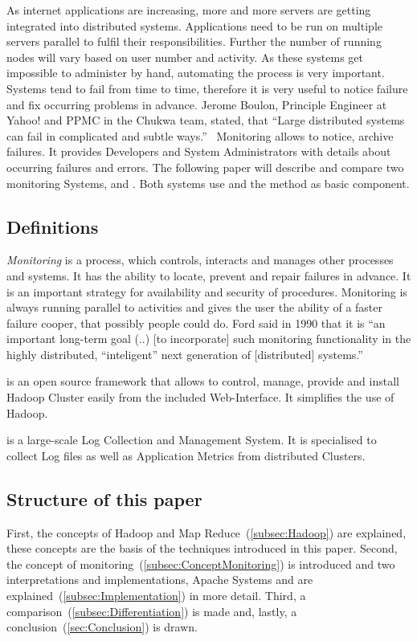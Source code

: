 As internet applications are increasing, more and more servers are getting integrated into distributed systems.\cite{Dinu2011} Applications need to be run on multiple servers parallel to fulfil their responsibilities. Further the number of running nodes will vary based on user number and activity.\cite{Jammes2012} As these systems get impossible to administer by hand, automating the process is very important.\cite{Jammes2012} Systems tend to fail from time to time, therefore it is very useful to notice failure and fix occurring problems in advance. Jerome Boulon, Principle Engineer at Yahoo! and PPMC in the Chukwa team, stated, that ``Large distributed systems can fail in complicated and subtle ways.''~\cite{Boulonb} Monitoring allows to notice, archive failures. It provides Developers and System Administrators with details about occurring failures and errors. The following paper will describe and compare two monitoring Systems, \amb and \chuk. Both systems use \hadoop and the \mr method as basic component.\cite{ApacheSoftwareFoundation2015}


\subsection{Definitions}

\textit{Monitoring} is a process, which controls, interacts and manages other processes and systems. 
It has the ability to locate, prevent and repair failures in advance. 
It is an important strategy for availability and security of procedures. 
Monitoring is always running parallel to activities and gives the user the ability of a faster failure cooper, that possibly people could do.\cite{Jammes2012}
Ford said in 1990 that it is ``an important long-term goal (..) [to incorporate] such monitoring functionality in the highly distributed, ``inteligent'' next generation of [distributed] systems.''~\cite{Ford1990}

\amb is an open source framework that allows to control, manage, provide and install Hadoop Cluster easily from the included Web-Interface. It simplifies the use of Hadoop.\cite{Hortonworks2013}

\chuk is a large-scale Log Collection and Management System. It is specialised to collect Log files as well as Application Metrics from distributed Clusters.

\subsection{Structure of this paper}
First, the concepts of Hadoop and Map Reduce~(\ref{subsec:Hadoop}) are explained, these concepts are the basis of the techniques introduced in this paper. 
Second, the concept of monitoring~(\ref{subsec:ConceptMonitoring}) is introduced and two interpretations and implementations, Apache Systems \amb and \chuk are explained~(\ref{subsec:Implementation}) in more detail. 
Third, a comparison~(\ref{subsec:Differentiation}) is made and, lastly, a conclusion~(\ref{sec:Conclusion}) is drawn.

